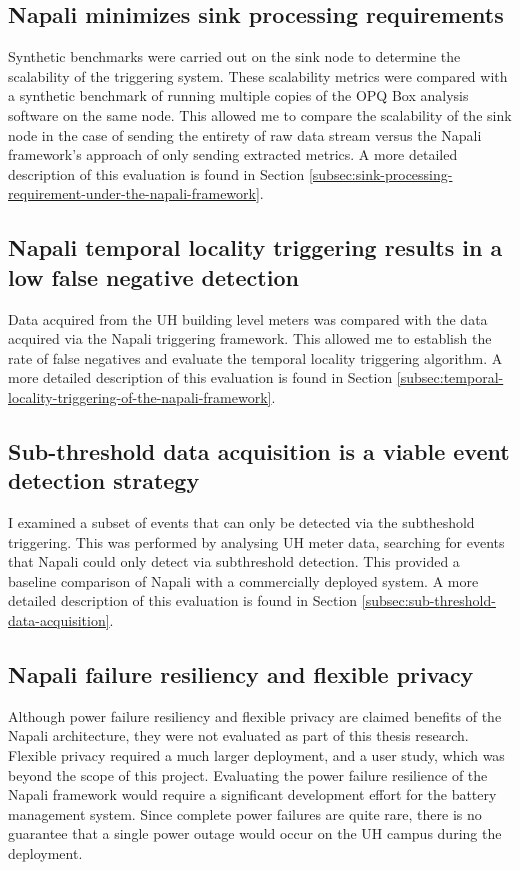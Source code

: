 \subsection{Napali minimizes sink processing requirements}\label{subsec:napali-minimizes-sink-processing-requirements}
Synthetic benchmarks were carried out on the sink node to determine the scalability of the triggering system.
These scalability metrics were compared with a synthetic benchmark of running multiple copies of the OPQ Box analysis software on the same node.
This allowed me to compare the scalability of the sink node in the case of sending the entirety of raw data stream versus the Napali framework's approach of only sending extracted metrics.
A more detailed description of this evaluation is found in Section \ref{subsec:sink-processing-requirement-under-the-napali-framework}.

\subsection{Napali temporal locality triggering results in a low false negative detection}\label{subsec:temporal-locality-capabilities:}
Data acquired from the UH building level meters was compared with the data acquired via the Napali triggering framework.
This allowed me to establish the rate of false negatives and evaluate the temporal locality triggering algorithm.
A more detailed description of this evaluation is found in Section \ref{subsec:temporal-locality-triggering-of-the-napali-framework}.


\subsection{Sub-threshold data acquisition is a viable event detection strategy}\label{subsec:sub-threshold-data-acquisition:}
I examined a subset of events that can only be detected via the subtheshold triggering.
This was performed by analysing UH meter data, searching for events that Napali could only detect via subthreshold detection.
This provided a baseline comparison of Napali with a commercially deployed system.
A more detailed description of this evaluation is found in Section \ref{subsec:sub-threshold-data-acquisition}.

\subsection{Napali failure resiliency and flexible privacy}\label{subsec:napali-failure-resiliency-and-flexible-privacy}
Although power failure resiliency and flexible privacy are claimed benefits of the Napali architecture, they were not evaluated as part of this thesis research.
Flexible privacy required a much larger deployment, and a user study, which was beyond the scope of this project.
Evaluating the power failure resilience of the Napali framework would require a significant development effort for the battery management system.
Since complete power failures are quite rare, there is no guarantee that a single power outage would occur on the UH campus during the deployment.

